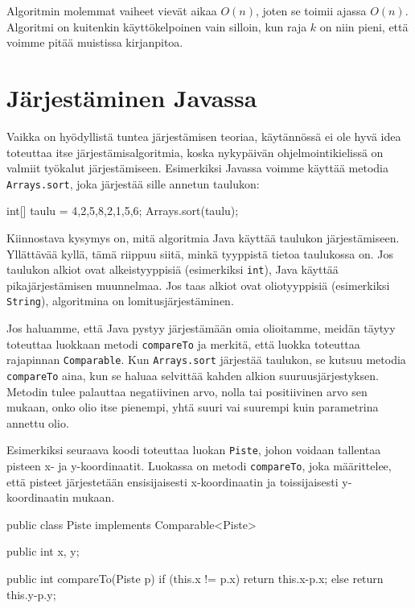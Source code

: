 Algoritmin molemmat vaiheet vievät aikaa $O(n)$,
joten se toimii ajassa $O(n)$.
Algoritmi on kuitenkin käyttökelpoinen vain silloin,
kun raja $k$ on niin pieni, että voimme pitää
muistissa kirjanpitoa.

\section{Järjestäminen Javassa}

Vaikka on hyödyllistä tuntea järjestämisen teoriaa,
käytännössä ei ole hyvä idea toteuttaa itse
järjestämisalgoritmia, koska nykypäivän ohjelmointikielissä
on valmiit työkalut järjestämiseen.
Esimerkiksi Javassa voimme käyttää metodia \texttt{Arrays.sort},
joka järjestää sille annetun taulukon:

\begin{code}
int[] taulu = {4,2,5,8,2,1,5,6};
Arrays.sort(taulu);
\end{code}

Kiinnostava kysymys on, mitä algoritmia Java käyttää
taulukon järjes\-tämiseen.
Yllättävää kyllä, tämä riippuu siitä, minkä tyyppistä tietoa
taulukossa on.
Jos taulukon alkiot ovat alkeistyyppisiä
(esimerkiksi \texttt{int}), Java käyttää 
pikajärjestämisen muunnelmaa.
Jos taas alkiot ovat oliotyyppisiä
(esimerkiksi \texttt{String}),
algoritmina on lomitusjärjestäminen.

Jos haluamme, että Java pystyy järjestämään omia olioitamme,
meidän täytyy toteuttaa luokkaan metodi \texttt{compareTo} ja
merkitä, että luokka toteuttaa rajapinnan \texttt{Comparable}.
Kun \texttt{Arrays.sort} järjestää taulukon,
se kutsuu metodia \texttt{compareTo} aina, kun se haluaa selvittää
kahden alkion suuruusjärjestyksen.
Metodin tulee palauttaa negatiivinen arvo, nolla tai positiivinen arvo
sen mukaan, onko olio itse pienempi, yhtä suuri vai suurempi
kuin parametrina annettu olio.

Esimerkiksi seuraava koodi toteuttaa luokan \texttt{Piste},
johon voidaan tallentaa pisteen x- ja y-koordinaatit.
Luokassa on metodi \texttt{compareTo}, joka määrittelee,
että pisteet järjestetään ensisijaisesti x-koordinaatin ja
toissijaisesti y-koordinaatin mukaan.

\begin{code}
public class Piste implements Comparable<Piste> {
    public int x, y;

    public int compareTo(Piste p) {
        if (this.x != p.x) return this.x-p.x;
        else return this.y-p.y;
    }
}
\end{code}

